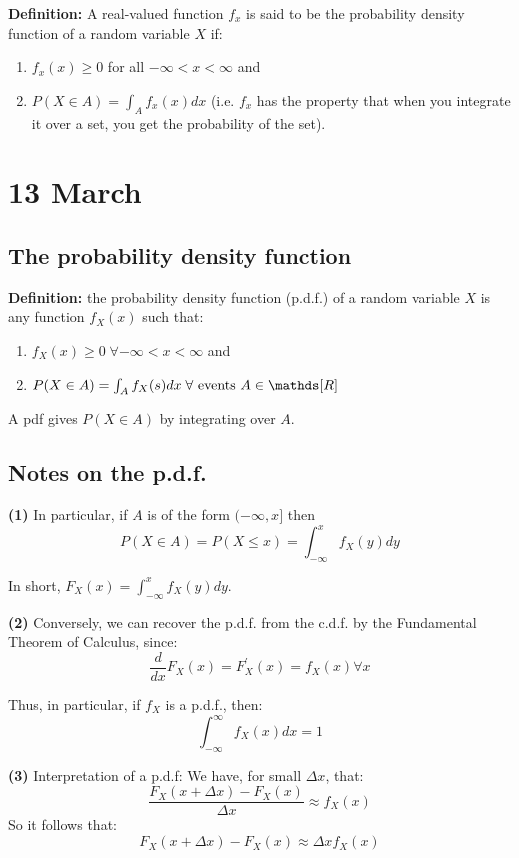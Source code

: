 \documentclass[12pt]{article}
\begin{document}
\textbf{Definition:} A real-valued function $f_x$ is said to be the probability density function of a random variable $X$ if:
\begin{enumerate}
    \item $f_x (x) \geq 0$ for all $- \infty < x < \infty$ and
    \item $P(X \in A) = \int_A f_x (x) dx$ (i.e. $f_x$ has the property that when you integrate it over a set, you get the probability of the set).
\end{enumerate}

\section{13 March}
\subsection{The probability density function}
\textbf{Definition:} the probability density function (p.d.f.) of a random variable $X$ is any function $f_X (x)$ such that:
\begin{enumerate}
    \item $f_X (x) \geq 0 \; \forall - \infty < x < \infty$ and
    \item $P(X \in A) = \int_A f_X (s) dx \; \forall \textnormal{ events } A \in \mathds[R]$
\end{enumerate}

A pdf gives $P(X \in A)$ by integrating over $A$.

\subsection{Notes on the p.d.f.}
\textbf{(1)} In particular, if $A$ is of the form $(- \infty, x]$ then %
\[
    P(X \in A) = P(X \leq x) = \int_{-\infty}^{x} f_X (y) dy
\]

In short, $F_X (x) = \int_{-\infty}^{x} f_X (y) dy$.

\textbf{(2)} Conversely, we can recover the p.d.f. from the c.d.f. by the Fundamental Theorem of Calculus, since:
\[
    \frac{d}{dx} F_X (x) = F^\prime_X (x) = f_X (x) \forall x
\]

Thus, in particular, if $f_X$ is a p.d.f., then:
\[
    \int_{-\infty}^{\infty} f_X (x) dx = 1
\]

\textbf{(3)} Interpretation of a p.d.f: We have, for small $\Delta x$, that:
\[
    \frac{F_X (x + \Delta x) - F_X (x)}{\Delta x} \approx f_X (x)
\]
So it follows that:
\[
    F_X (x+\Delta x) - F_X (x) \approx \Delta x f_X (x)
\]
\end{document}
